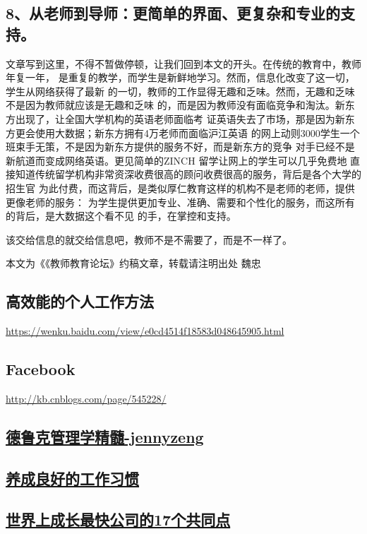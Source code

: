 \documentclass[11pt]{ctexart}
\begin{document}
{{{{\subsection{8、从老师到导师：更简单的界面、更复杂和专业的支持。}
\label{sec:orgf034fb1}

文章写到这里，不得不暂做停顿，让我们回到本文的开头。在传统的教育中，教师年复一年，
是重复的教学，而学生是新鲜地学习。然而，信息化改变了这一切，学生从网络获得了最新
的一切，教师的工作显得无趣和乏味。然而，无趣和乏味不是因为教师就应该是无趣和乏味
的，而是因为教师没有面临竞争和淘汰。新东方出现了，让全国大学机构的英语老师面临考
证英语失去了市场，那是因为新东方更会使用大数据；新东方拥有4万老师而面临沪江英语
的网上动则3000学生一个班束手无策，不是因为新东方提供的服务不好，而是新东方的竞争
对手已经不是新航道而变成网络英语。更见简单的ZINCH 留学让网上的学生可以几乎免费地
直接知道传统留学机构非常资深收费很高的顾问收费很高的服务，背后是各个大学的招生官
为此付费，而这背后，是类似厚仁教育这样的机构不是老师的老师，提供更像老师的服务：
为学生提供更加专业、准确、需要和个性化的服务，而这所有的背后，是大数据这个看不见
的手，在掌控和支持。

该交给信息的就交给信息吧，教师不是不需要了，而是不一样了。

本文为《《教师教育论坛》约稿文章，转载请注明出处
魏忠
\subsection{高效能的个人工作方法}
\label{sec:org6c6b2c3}
\url{https://wenku.baidu.com/view/e0cd4514f18583d048645905.html}
\subsection{Facebook}
\label{sec:org142f573}
\url{http://kb.cnblogs.com/page/545228/}

\subsection{\href{https://wenku.baidu.com/view/c974011c227916888486d7b6.html}{德鲁克管理学精髓-jennyzeng}}
\label{sec:org57792d2}
\subsection{\href{https://wenku.baidu.com/view/c1b258d54afe04a1b171de3d.html}{养成良好的工作习惯}}
\label{sec:orga7700ee}
\subsection{\href{http://news.mbalib.com/story/237365}{世界上成长最快公司的17个共同点}}
\label{sec:org25c5ee9}
}}}}
\end{document}
